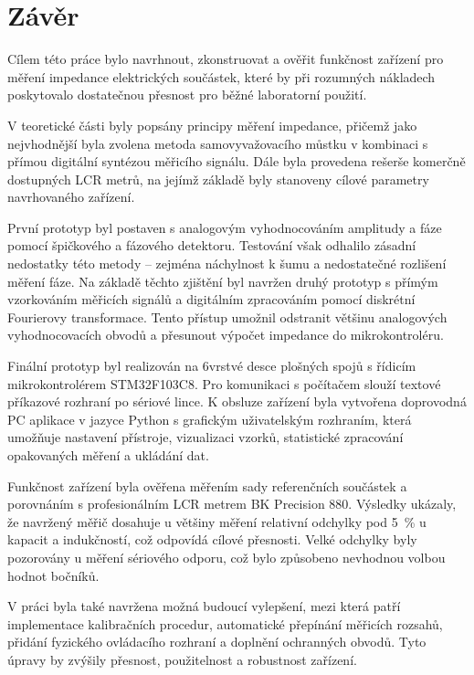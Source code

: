\chapter*{Závěr}
{}

Cílem této práce bylo navrhnout, zkonstruovat a ověřit funkčnost zařízení 
pro měření impedance elektrických součástek, které by při rozumných nákladech 
poskytovalo dostatečnou přesnost pro běžné laboratorní použití.

V teoretické části byly popsány principy měření impedance, přičemž jako 
nejvhodnější byla zvolena metoda samovyvažovacího můstku v kombinaci s 
přímou digitální syntézou měřicího signálu. Dále byla provedena rešerše 
komerčně dostupných LCR metrů, na jejímž základě byly stanoveny cílové 
parametry navrhovaného zařízení.

První prototyp byl postaven s analogovým vyhodnocováním amplitudy a fáze 
pomocí špičkového a fázového detektoru. Testování však odhalilo zásadní 
nedostatky této metody -- zejména náchylnost k šumu a nedostatečné rozlišení 
měření fáze. Na základě těchto zjištění byl navržen druhý prototyp s přímým 
vzorkováním měřicích signálů a digitálním zpracováním pomocí diskrétní 
Fourierovy transformace. Tento přístup umožnil odstranit většinu analogových 
vyhodnocovacích obvodů a přesunout výpočet impedance do mikrokontroléru.

Finální prototyp byl realizován na 6vrstvé desce plošných spojů s řídicím 
mikrokontrolérem STM32F103C8. Pro komunikaci s počítačem slouží textové 
příkazové rozhraní po sériové lince. K obsluze zařízení byla vytvořena 
doprovodná PC aplikace v jazyce Python s grafickým uživatelským rozhraním, 
která umožňuje nastavení přístroje, vizualizaci vzorků, statistické zpracování
 opakovaných měření a ukládání dat.

Funkčnost zařízení byla ověřena měřením sady referenčních součástek a 
porovnáním s profesionálním LCR metrem BK Precision 880. 
Výsledky ukázaly, že navržený měřič dosahuje u většiny měření relativní 
odchylky pod 5~\% u kapacit a indukčností, což odpovídá cílové přesnosti. 
Velké odchylky byly pozorovány u měření sériového odporu, což bylo způsobeno 
nevhodnou volbou hodnot bočníků.

V práci byla také navržena možná budoucí vylepšení, 
mezi která patří implementace kalibračních procedur, 
automatické přepínání měřicích rozsahů, přidání fyzického ovládacího 
rozhraní a doplnění ochranných obvodů. Tyto úpravy by zvýšily přesnost, 
použitelnost a robustnost zařízení.
